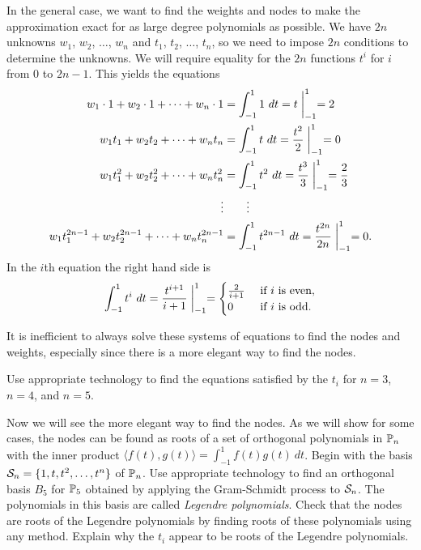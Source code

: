 In the general case, we want to find the weights and nodes to make the approximation exact for as large degree polynomials as possible. We have $2n$ unknowns $w_1$, $w_2$, $\ldots$, $w_n$ and $t_1$, $t_2$, $\ldots$, $t_n$, so we need to impose $2n$ conditions to determine the unknowns. We will require equality for the $2n$ functions $t^i$ for $i$ from 0 to $2n-1$. This yields the equations
\begin{align*}
w_1\cdot 1 + w_2\cdot 1 + \cdots + w_n\cdot 1 &= \int_{-1}^1 1 \ dt = t\biggm|_{-1}^1 = 2 \\
w_1t_1 + w_2t_2 + \cdots + w_nt_n &= \int_{-1}^1 t \ dt = \frac{t^2}{2}\biggm|_{-1}^1 = 0 \\
w_1t_1^2 + w_2t_2^2 + \cdots + w_nt_n^2 &= \int_{-1}^1 t^2 \ dt = \frac{t^3}{3}\biggm|_{-1}^1 = \frac{2}{3} \\
\qquad \vdots & \qquad \vdots \\
w_1t_1^{2n-1} + w_2t_2^{2n-1} + \cdots + w_nt_n^{2n-1} &= \int_{-1}^1 t^{2n-1} \ dt = \frac{t^{2n}}{2n}\biggm|_{-1}^1 = 0.
\end{align*}
In the $i$th equation the right hand side is
\[\int_{-1}^1 t^i \ dt = \frac{t^{i+1}}{i+1}\biggm|_{-1}^1 = \begin{cases}
\frac{2}{i+1} & \text{ if $i$ is even}, \\
0			& \text{ if $i$ is odd}.
\end{cases}\]

\begin{pactivity} \label{act:GQ_n} It is inefficient to always solve these systems of equations to find the nodes and weights, especially since there is a more elegant way to find the nodes.
	\ba
	\item Use appropriate technology to find the equations satisfied by the $t_i$ for $n=3$, $n=4$, and $n=5$. 


	\item Now we will see the more elegant way to find the nodes. As we will show for some cases, the nodes can be found as roots of a set of orthogonal polynomials in $\mathbb{P}_n$ with the inner product $\langle f(t), g(t) \rangle = \int_{-1}^1 f(t)g(t) \ dt$. Begin with the basis $\mathcal{S}_n = \{1, t, t^2, \ldots, t^n\}$ of $\mathbb{P}_n$. Use appropriate technology to find an orthogonal basis $B_5$ for $\mathbb{P}_5$ obtained by applying the Gram-Schmidt process to $\mathcal{S}_n$. The polynomials in this basis are called \emph{Legendre polynomials}. Check that the nodes are roots of the Legendre polynomials by finding roots of these polynomials using any method. Explain why the $t_i$ appear to be roots of the Legendre polynomials.
				
	\ea
\end{pactivity}


